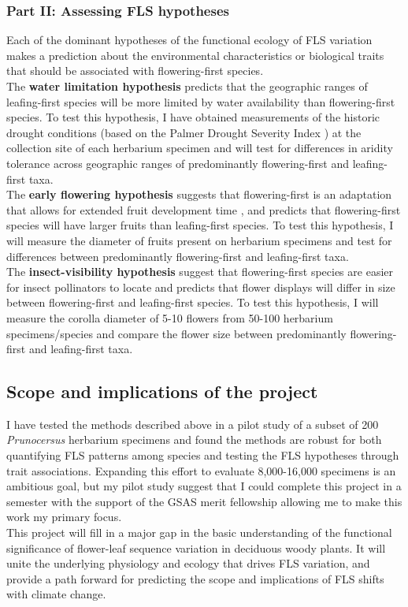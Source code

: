 \documentclass[11pt]{article}
\begin{document}
\subsubsection*{Part II: Assessing FLS hypotheses}
Each of the dominant hypotheses of the functional ecology of FLS variation makes a prediction about the environmental characteristics or biological traits that should be associated with flowering-first species.\\

The \textbf{water limitation hypothesis} \citep{Gougherty2018} predicts that the geographic ranges of leafing-first species will be more limited by water availability than flowering-first species. To test this hypothesis, I have obtained measurements of the historic drought conditions (based on the Palmer Drought Severity Index \citep{Dai:2004aa}) at the collection site of each herbarium specimen and will test for differences in aridity tolerance across geographic ranges of predominantly flowering-first and leafing-first taxa.\\

The \textbf{early flowering hypothesis} suggests that flowering-first is an adaptation that allows for extended fruit development time \citep{Primack1987}, and predicts that flowering-first species will have larger fruits than leafing-first species. To test this hypothesis, I will measure the diameter of fruits present on herbarium specimens and test for differences between predominantly flowering-first and leafing-first taxa.\\

The \textbf{insect-visibility hypothesis} suggest that flowering-first species are easier for insect pollinators to locate \citep{Janzen1967} and predicts that flower displays will differ in size between flowering-first and leafing-first species. To test this hypothesis, I will measure the corolla diameter of 5-10 flowers from 50-100 herbarium specimens/species and compare the flower size between predominantly flowering-first and leafing-first taxa.

\subsection*{Scope and implications of the project}
I have tested the methods described above in a pilot study of a subset of 200 \textit{Prunocersus} herbarium  specimens and found the methods are robust for both quantifying FLS patterns among species and testing the FLS hypotheses through trait associations. Expanding this effort to evaluate 8,000-16,000 specimens is an ambitious goal, but my pilot study suggest that I could complete this project in a semester with the support of the GSAS merit fellowship allowing me to make this work my primary focus.\\

This project will fill in a major gap in the basic understanding of the functional significance of flower-leaf sequence variation in deciduous woody plants. It will unite the underlying physiology and ecology that drives FLS variation, and provide a path forward for predicting the scope and implications of FLS shifts with climate change.


\end{document}
